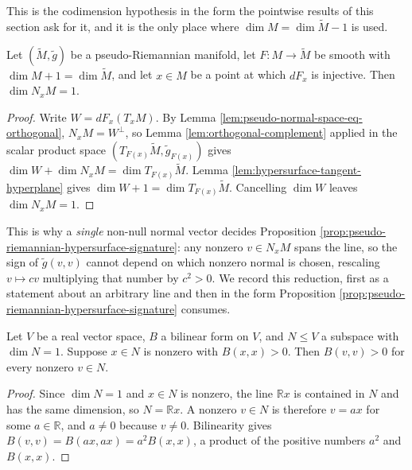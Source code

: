 This is the codimension hypothesis in the form the pointwise results of this section ask for it, and it is the only place where $\dim M = \dim\tilde{M} - 1$ is used.

\begin{lemma}
\label{lem:pseudo-normal-space-line}
\leanok
{}
Let $(\tilde{M},\tilde{g})$ be a pseudo-Riemannian manifold, let $F : M \to \tilde{M}$ be smooth with $\dim M + 1 = \dim\tilde{M}$, and let $x \in M$ be a point at which $dF_x$ is injective. Then $\dim N_xM = 1$.
\end{lemma}

\begin{proof}
\leanok
{}
Write $W = dF_x(T_xM)$. By Lemma \ref{lem:pseudo-normal-space-eq-orthogonal}, $N_xM = W^\perp$, so Lemma \ref{lem:orthogonal-complement} applied in the scalar product space $(T_{F(x)}\tilde{M}, \tilde{g}_{F(x)})$ gives $\dim W + \dim N_xM = \dim T_{F(x)}\tilde{M}$. Lemma \ref{lem:hypersurface-tangent-hyperplane} gives $\dim W + 1 = \dim T_{F(x)}\tilde{M}$. Cancelling $\dim W$ leaves $\dim N_xM = 1$.
\end{proof}

This is why a \emph{single} non-null normal vector decides Proposition \ref{prop:pseudo-riemannian-hypersurface-signature}: any nonzero $v \in N_xM$ spans the line, so the sign of $\tilde{g}(v,v)$ cannot depend on which nonzero normal is chosen, rescaling $v \mapsto cv$ multiplying that number by $c^2 > 0$. We record this reduction, first as a statement about an arbitrary line and then in the form Proposition \ref{prop:pseudo-riemannian-hypersurface-signature} consumes.

\begin{lemma}
\label{lem:line-sign-one-vector}
\leanok
Let $V$ be a real vector space, $B$ a bilinear form on $V$, and $N \leq V$ a subspace with
$\dim N = 1$. Suppose $x \in N$ is nonzero with $B(x,x) > 0$. Then $B(v,v) > 0$ for every
nonzero $v \in N$.
\end{lemma}

\begin{proof}
\leanok
Since $\dim N = 1$ and $x \in N$ is nonzero, the line $\mathbb{R}x$ is contained in $N$ and has the
same dimension, so $N = \mathbb{R}x$. A nonzero $v \in N$ is therefore $v = ax$ for some
$a \in \mathbb{R}$, and $a \neq 0$ because $v \neq 0$. Bilinearity gives
$B(v,v) = B(ax, ax) = a^2 B(x,x)$, a product of the positive numbers $a^2$ and $B(x,x)$.
\end{proof}

